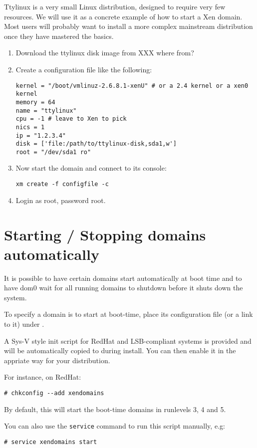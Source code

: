 \documentclass[11pt,twoside,final,openright]{xenstyle}
\begin{document}
Ttylinux is a very small Linux distribution, designed to
require very few resources.  We will use it as a concrete example of
how to start a Xen domain.  Most users will probably want to install a
more complex mainstream distribution once they have mastered the
basics.

\begin{enumerate}
\item Download the ttylinux disk image from XXX where from?
\item Create a configuration file like the following:
\begin{verbatim}
kernel = "/boot/vmlinuz-2.6.8.1-xenU" # or a 2.4 kernel or a xen0 kernel
memory = 64
name = "ttylinux"
cpu = -1 # leave to Xen to pick
nics = 1
ip = "1.2.3.4"
disk = ['file:/path/to/ttylinux-disk,sda1,w']
root = "/dev/sda1 ro"
\end{verbatim}
\item Now start the domain and connect to its console:
\begin{verbatim}
xm create -f configfile -c
\end{verbatim}
\item Login as root, password root.
\end{enumerate}

\section{Starting / Stopping domains automatically}

It is possible to have certain domains start automatically at boot
time and to have dom0 wait for all running domains to shutdown before
it shuts down the system.

To specify a domain is to start at boot-time, place its
configuration file (or a link to it) under .

A Sys-V style init script for RedHat and LSB-compliant systems is
provided and will be automatically copied to 
during install.  You can then enable it in the appriate way for your
distribution.

For instance, on RedHat:

\verb_# chkconfig --add xendomains_

By default, this will start the boot-time domains in runlevels 3, 4
and 5.

You can also use the {\tt service} command to run this script manually, e.g:

\verb_# service xendomains start_
\end{document}
